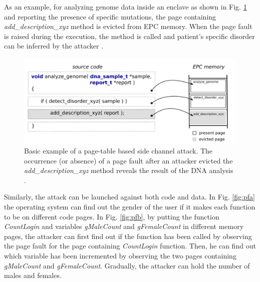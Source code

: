 As an example, for analyzing genome data inside an enclave as shown in Fig. \ref{fig:pfdna} and reporting the presence of specific mutations, the page containing \emph{add\_description\_xyz} method is evicted from EPC memory. When the page fault is raised during the execution, the method is called and patient's specific disorder can be inferred by the attacker \cite{heisenberg}.

\begin{figure}
	\includegraphics[scale=0.25]{images/pfdna}
	\caption{Basic example of a page-table based side channel attack. The occurrence (or absence) of a page fault after an attacker evicted the \emph{add\_description\_xyz} method reveals	the result of the DNA analysis \cite{heisenberg}.}
	\label{fig:pfdna}
\end{figure}

Similarly, the attack can be launched against both code and data. In Fig. \ref{fig:pfa} the operating system can find out the gender of the user if it makes each function to be on different code pages. In Fig. \ref{fig:pfb}, by putting the function \emph{CountLogin} and variables \emph{gMaleCount} and \emph{gFemaleCount} in different memory pages, the attacker can first find out if the function has been called by observing the page fault for the page containing \emph{CountLogin} function. Then, he can find out which variable has been incremented by observing the two pages containing \emph{gMaleCount} and \emph{gFemaleCount}. Gradually, the attacker can hold the number of males and females.

